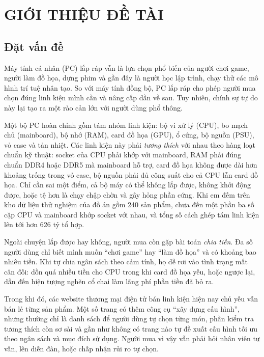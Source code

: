 \chapter{GIỚI THIỆU ĐỀ TÀI}
\label{chap:gioi-thieu}

\section{Đặt vấn đề}

Máy tính cá nhân (PC) lắp ráp vẫn là lựa chọn phổ biến của người chơi game, người làm đồ họa, dựng phim và gần đây là người học lập trình, chạy thử các mô hình trí tuệ nhân tạo. So với máy tính đồng bộ, PC lắp ráp cho phép người mua chọn đúng linh kiện mình cần và nâng cấp dần về sau. Tuy nhiên, chính sự tự do này lại tạo ra một rào cản lớn với người dùng phổ thông.

Một bộ PC hoàn chỉnh gồm tám nhóm linh kiện: bộ vi xử lý (CPU), bo mạch chủ (mainboard), bộ nhớ (RAM), card đồ họa (GPU), ổ cứng, bộ nguồn (PSU), vỏ case và tản nhiệt. Các linh kiện này phải \emph{tương thích} với nhau theo hàng loạt chuẩn kỹ thuật: socket của CPU phải khớp với mainboard, RAM phải đúng chuẩn DDR4 hoặc DDR5 mà mainboard hỗ trợ, card đồ họa không được dài hơn khoảng trống trong vỏ case, bộ nguồn phải đủ công suất cho cả CPU lẫn card đồ họa. Chỉ cần sai một điểm, cả bộ máy có thể không lắp được, không khởi động được, hoặc tệ hơn là chạy chập chờn và gây hỏng phần cứng. Khi em đếm trên kho dữ liệu thử nghiệm của đồ án gồm 240 sản phẩm, chưa đến một phần ba số cặp CPU và mainboard khớp socket với nhau, và tổng số cách ghép tám linh kiện lên tới hơn 626 tỷ tổ hợp.

Ngoài chuyện lắp được hay không, người mua còn gặp bài toán \emph{chia tiền}. Đa số người dùng chỉ biết mình muốn ``chơi game'' hay ``làm đồ họa'' và có khoảng bao nhiêu tiền. Khi tự chia ngân sách theo cảm tính, họ dễ rơi vào tình trạng mất cân đối: dồn quá nhiều tiền cho CPU trong khi card đồ họa yếu, hoặc ngược lại, dẫn đến hiện tượng nghẽn cổ chai làm lãng phí phần tiền đã bỏ ra.

Trong khi đó, các website thương mại điện tử bán linh kiện hiện nay chủ yếu vẫn bán lẻ từng sản phẩm. Một số trang có thêm công cụ ``xây dựng cấu hình'', nhưng thường chỉ là danh sách để người dùng tự chọn từng món, phần kiểm tra tương thích còn sơ sài và gần như không có trang nào tự đề xuất cấu hình tối ưu theo ngân sách và mục đích sử dụng. Người mua vì vậy vẫn phải hỏi nhân viên tư vấn, lên diễn đàn, hoặc chấp nhận rủi ro tự chọn.

